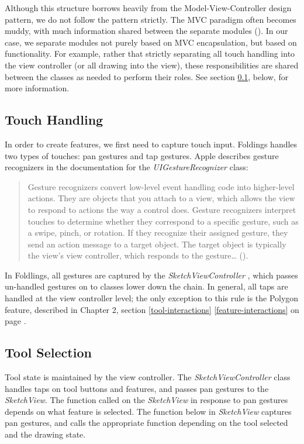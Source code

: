 Although this structure borrows heavily from the Model-View-Controller
design pattern, we do not follow the pattern strictly. The MVC paradigm
often becomes muddy, with much information shared between the separate
modules (\citet{veit2003model}). In our case, we separate modules not
purely based on MVC encapsulation, but based on functionality. For
example, rather that strictly separating all touch handling into the
view controller (or all drawing into the view), these responsibilities
are shared between the classes as needed to perform their roles. See
section \ref{touch-handling}, below, for more information.

\subsection{Touch Handling}\label{touch-handling}

In order to create features, we first need to capture touch input.
Foldings handles two types of touches: pan gestures and tap gestures.
Apple describes gesture recognizers in the documentation for the
\emph{UIGestureRecognizer} class:

\begin{quote}
Gesture recognizers convert low-level event handling code into
higher-level actions. They are objects that you attach to a view, which
allows the view to respond to actions the way a control does. Gesture
recognizers interpret touches to determine whether they correspond to a
specific gesture, such as a swipe, pinch, or rotation. If they recognize
their assigned gesture, they send an action message to a target object.
The target object is typically the view's view controller, which
responds to the gesture\ldots{} (\citet{appledocs}).
\end{quote}

In Foldlings, all gestures are captured by the
\emph{SketchViewController} , which passes un-handled gestures on to
classes lower down the chain. In general, all taps are handled at the
view controller level; the only exception to this rule is the Polygon
feature, described in Chapter 2, section \ref{tool-interactions}
\ref{feature-interactions}  on page
\pageref{feature-interactions}.

\subsection{Tool Selection}\label{tool-selection}

Tool state is maintained by the view controller. The
\emph{SketchViewController} class handles taps on tool buttons and
features, and passes pan gestures to the \emph{SketchView}. The function
called on the \emph{SketchView} in response to pan gestures depends on
what feature is selected. The function below in \emph{SketchView}
captures pan gestures, and calls the appropriate function depending on
the tool selected and the drawing state.

